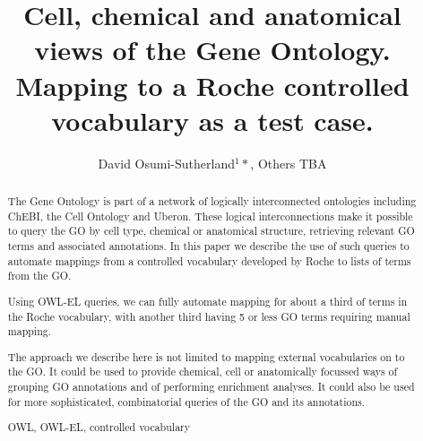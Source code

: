 \documentclass[runningheads,a4paper]{llncs}
\newcommand{\keywords}[1]{\par\addvspace\baselineskip
\noindent\keywordname\enspace\ignorespaces#1}
\begin{document}
\mainmatter  %

\title{Cell, chemical and anatomical views of the Gene Ontology.  Mapping to a Roche controlled vocabulary as a test case.}


%
%
\author{David Osumi-Sutherland$^1*$, Others TBA}  %

%



%
%

\toctitle{}
\tocauthor{}
\maketitle


\begin{abstract}

The Gene Ontology is part of a network of logically interconnected ontologies including ChEBI, the Cell Ontology and Uberon.  These logical interconnections make it possible to query the GO by cell type, chemical or anatomical structure, retrieving relevant GO terms and associated annotations.  In this paper we describe the use of such queries to automate mappings from a controlled vocabulary developed by Roche to lists of terms from the GO.

Using OWL-EL queries, we can fully automate mapping for about a third of terms in the Roche vocabulary, with another third having 5 or less GO terms requiring manual mapping.

The approach we describe here is not limited to mapping external vocabularies on to the GO. It could be used to provide chemical, cell or anatomically focussed ways of grouping GO annotations and of performing enrichment analyses. It could also be used for more sophisticated, combinatorial queries of the GO and its annotations.


\keywords{OWL, OWL-EL, controlled vocabulary}
\end{abstract}
\end{document}
